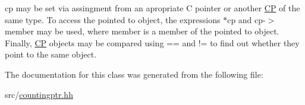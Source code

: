 cp may be set via assingment from an apropriate C pointer or another \hyperlink{classhdnum_1_1CP}{CP} of the same type. To access the pointed to object, the expressions $\ast$cp and cp-\/$>$member may be used, where member is a member of the pointed to object. Finally, \hyperlink{classhdnum_1_1CP}{CP} objects may be compared using == and != to find out whether they point to the same object. 

The documentation for this class was generated from the following file:\begin{DoxyCompactItemize}
\item 
src/\hyperlink{countingptr_8hh}{countingptr.hh}\end{DoxyCompactItemize}
